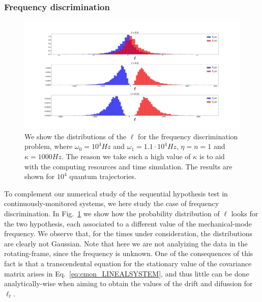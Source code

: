\subsubsection{Frequency discrimination}
\begin{figure}[t!]
    \centering
    \includegraphics[width=1.\textwidth]{Figures/CMON/freq-discri/histo_freqs.pdf}
    \caption{We show the distributions of the $\ell$ for the frequency discrimination problem, where $\omega_0 = 10^4 Hz$ and $\omega_1 = 1.1 \cdot 10^4 Hz$, $\eta = n = 1$ and $\kappa=1000 Hz$. The reason we take such a high value of $\kappa$ is to aid with the computing resources and time simulation. The results are shown for $10^{4}$ quantum trajectories.}
    \label{fig:freq_histo}
\end{figure}

To complement our numerical study of the sequential hypothesis test in continuously-monitored systems, we here study the case of frequency discrimination. In Fig.~\ref{fig:freq_histo} we show how the probability distribution of $\ell$ looks for the two hypothesis, each associated to a different value of the mechanical-mode frequency. We observe that, for the times under consideration, the distributions are clearly not Gaussian. Note that here we are not analyizing the data in the rotating-frame, since the frequency is unknown. One of the consequences of this fact is that a transcendental equation for the stationary value of the covariance matrix arises in Eq.~\ref{eq:cmon_LINEALSYSTEM}, and thus little can be done analytically-wise when aiming to obtain the values of the drift and difussion for $\ell_t$.

